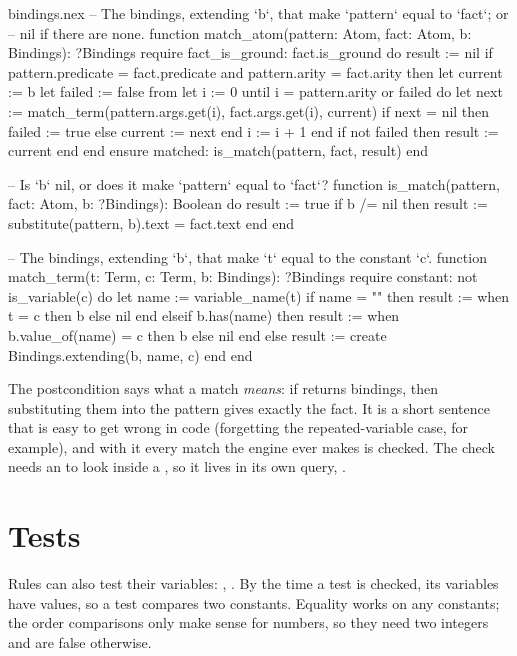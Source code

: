 \begin{continued}{bindings.nex}
-- The bindings, extending `b`, that make `pattern` equal to `fact`; or
-- nil if there are none.
function match_atom(pattern: Atom, fact: Atom, b: Bindings): ?Bindings
require
  fact_is_ground: fact.is_ground
do
  result := nil
  if pattern.predicate = fact.predicate and pattern.arity = fact.arity then
    let current := b
    let failed := false
    from let i := 0 until i = pattern.arity or failed do
      let next := match_term(pattern.args.get(i), fact.args.get(i), current)
      if next = nil then
        failed := true
      else
        current := next
      end
      i := i + 1
    end
    if not failed then
      result := current
    end
  end
ensure
  matched: is_match(pattern, fact, result)
end

-- Is `b` nil, or does it make `pattern` equal to `fact`?
function is_match(pattern, fact: Atom, b: ?Bindings): Boolean
do
  result := true
  if b /= nil then
    result := substitute(pattern, b).text = fact.text
  end
end

-- The bindings, extending `b`, that make `t` equal to the constant `c`.
function match_term(t: Term, c: Term, b: Bindings): ?Bindings
require
  constant: not is_variable(c)
do
  let name := variable_name(t)
  if name = "" then
    result := when t = c then b else nil end
  elseif b.has(name) then
    result := when b.value_of(name) = c then b else nil end
  else
    result := create Bindings.extending(b, name, c)
  end
end
\end{continued}

The postcondition  says what a match \emph{means}: if
 returns bindings, then substituting them into the pattern
gives exactly the fact. It is a short sentence that is easy to get wrong in
code (forgetting the repeated-variable case, for example), and with it
every match the engine ever makes is checked. The check needs an
 to look inside a , so it lives in its own
query, .

\section{Tests}

Rules can also test their variables: , . By
the time a test is checked, its variables have values, so a test compares
two constants. Equality works on any constants; the order comparisons only
make sense for numbers, so they need two integers and are false otherwise.

